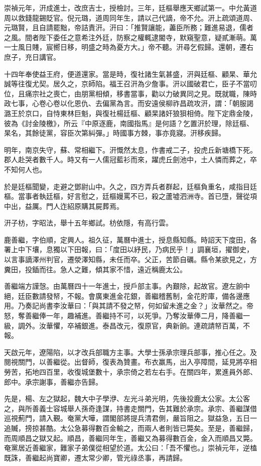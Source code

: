 \begin{pinyinscope}
崇禎元年，汧成進士，改庶吉士，授檢討。三年，廷樞舉應天鄉試第一。中允黃道周以救錢龍錫貶官。倪元璐，道周同年生，請以己代謫，帝不允。汧上疏頌道周、元璐賢，且自請罷黜，帝詰責汧。汧曰：「推賢讓能，藎臣所務；難進易退，儒者之風。間者陛下委任之意希注外廷，防察之權輒逮閽寺，默窺聖意，疑貳漸萌。萬一士風日賤，宸嚮日移，明盛之時為憂方大。」帝不聽。汧尋乞假歸。還朝，遷右庶子，充日講官。

十四年奉使益王府，便道還家。當是時，復社諸生氣甚盛，汧與廷樞、顧杲、華允誠等往復尤契。居久之，京師陷。福王召汧為少詹事。汧以國破君亡，臣子不當叨位，且痛宗社之喪亡，由朋黨相傾，移書當事，勸以力破異同之見。既就職，陳時政七事，心卷心卷以化恩仇、去偏黨為言。而安遠侯柳祚昌疏攻汧，謂：「朝服謁潞王於京口，自恃東林巨魁，與復社楊廷樞、顧杲諸奸狼狽相倚。陛下定鼎金陵，彼為《討金陵檄》，所云『中原逐鹿，南國指馬』是何語？乞置汧於理，除廷樞、杲名，其餘徒黨，容臣次第糾彈。」時國事方棘，事亦竟寢。汧移疾歸。

明年，南京失守，蘇、常相繼下。汧慨然太息，作書戒二子，投虎丘新塘橋下死。郡人赴哭者數千人。時又有一人儒冠藍衫而來，躍虎丘劍池中，土人憐而葬之，卒不知何人也。

於是廷樞聞變，走避之鄧尉山中。久之，四方弄兵者群起，廷樞負重名，咸指目廷樞。當事者執廷樞，好言慰之，廷樞嫚罵不已，殺之蘆墟泗洲寺。首已墮，聲從項中出，益厲。門人迮紹原購其屍葬焉。

汧子枋，字昭法，舉十五年鄉試。枋依隱，有高行雲。

鹿善繼，字伯順，定興人。祖久征，萬曆中進士，授息縣知縣。時詔天下度田，各署上中下壤，息獨以下田報，曰：「度田以紓民，乃病民乎！」調襄垣，擢御史，以言事謫澤州判官，遷滎澤知縣，未任而卒。父正，苦節自礪。縣令某欲見之，方糞田，投鍤而往。急人之難，傾其家不惜，遠近稱鹿太公。

善繼端方謹愨。由萬曆四十一年進士，授戶部主事。內艱除，起故官。遼左餉中絕，廷臣數請發帑，不報。會廣東進金花銀，善繼稽舊制，金花貯庫，備各邊應用。乃奏記尚書李汝華曰：「與其請不發之帑，何如留未進之金？」汝華然之。帝怒，奪善繼俸一年，趣補進。善繼持不可，以死爭。乃奪汝華俸二月，降善繼一級，調外。汝華懼，卒補銀進。泰昌改元，復原官，典新餉。連疏請帑百萬，不報。

天啟元年，遼陽陷，以才改兵部職方主事。大學士孫承宗理兵部事，推心任之。及閱視關門，以善繼從。出督師，復表為贊畫。布衣羸馬，出入亭障間，延見將卒相勞苦，拓地四百里，收復城堡數十，承宗倚之若左右手。在關四年，累進員外郎、郎中。承宗謝事，善繼亦告歸。

先是，楊、左之獄起，魏大中子學洢、左光斗弟光明，先後投鹿太公家。太公客之，與所善義士容城舉人孫奇逢謀，持書走關門，告其難於承宗。承宗、善繼謀借巡視薊門，請入覲。奄黨大嘩，謂閣部將提兵清君側，嚴旨阻之。獄益急，五日一追贓，搒掠甚酷。太公急募得數百金輸之，而兩人者則皆已斃矣。至是，善繼歸，而周順昌之獄又起。順昌，善繼同年生，善繼又為募得數百金，金入而順昌又斃。奄黨居近善繼家，難家子弟僕從相望於道。太公曰：「吾不懼也。」崇禎元年，逆榼既誅，善繼起尚寶卿，遷太常少卿，管光祿丞事，再請歸。


\end{pinyinscope}
